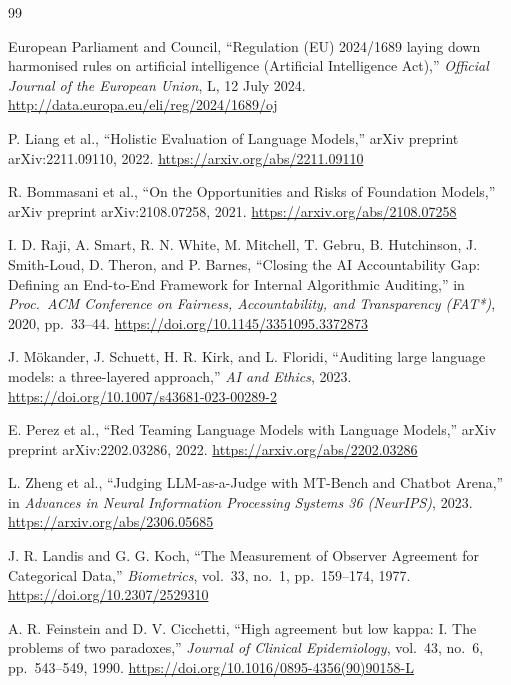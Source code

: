 \documentclass[11pt,a4paper]{article}
\begin{document}
\begin{thebibliography}{99}\small\setlength{\itemsep}{2pt}\setlength{\parskip}{0pt}

 European Parliament and Council, ``Regulation (EU) 2024/1689 laying down harmonised rules on artificial intelligence (Artificial Intelligence Act),'' \emph{Official Journal of the European Union}, L, 12 July 2024. \url{http://data.europa.eu/eli/reg/2024/1689/oj}

 P. Liang et al., ``Holistic Evaluation of Language Models,'' arXiv preprint arXiv:2211.09110, 2022. \url{https://arxiv.org/abs/2211.09110}

 R. Bommasani et al., ``On the Opportunities and Risks of Foundation Models,'' arXiv preprint arXiv:2108.07258, 2021. \url{https://arxiv.org/abs/2108.07258}

 I. D. Raji, A. Smart, R. N. White, M. Mitchell, T. Gebru, B. Hutchinson, J. Smith-Loud, D. Theron, and P. Barnes, ``Closing the AI Accountability Gap: Defining an End-to-End Framework for Internal Algorithmic Auditing,'' in \emph{Proc.\ ACM Conference on Fairness, Accountability, and Transparency (FAT*)}, 2020, pp.\ 33--44. \url{https://doi.org/10.1145/3351095.3372873}

 J. Mökander, J. Schuett, H. R. Kirk, and L. Floridi, ``Auditing large language models: a three-layered approach,'' \emph{AI and Ethics}, 2023. \url{https://doi.org/10.1007/s43681-023-00289-2}

 E. Perez et al., ``Red Teaming Language Models with Language Models,'' arXiv preprint arXiv:2202.03286, 2022. \url{https://arxiv.org/abs/2202.03286}

 L. Zheng et al., ``Judging LLM-as-a-Judge with MT-Bench and Chatbot Arena,'' in \emph{Advances in Neural Information Processing Systems 36 (NeurIPS)}, 2023. \url{https://arxiv.org/abs/2306.05685}

 J. R. Landis and G. G. Koch, ``The Measurement of Observer Agreement for Categorical Data,'' \emph{Biometrics}, vol.\ 33, no.\ 1, pp.\ 159--174, 1977. \url{https://doi.org/10.2307/2529310}

 A. R. Feinstein and D. V. Cicchetti, ``High agreement but low kappa: I. The problems of two paradoxes,'' \emph{Journal of Clinical Epidemiology}, vol.\ 43, no.\ 6, pp.\ 543--549, 1990. \url{https://doi.org/10.1016/0895-4356(90)90158-L}


\end{thebibliography}
\end{document}
